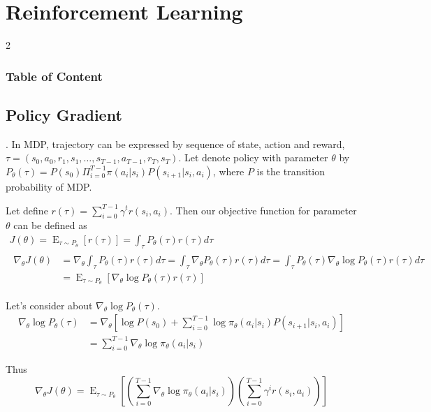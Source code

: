 \documentclass[8pt]{beamer}
\begin{document}
\section{Reinforcement Learning}
\begingroup
    \begin{frame}
        \begin{multicols}{2}
            \frametitle{Table of Content}
            \tableofcontents
        \end{multicols}
    \end{frame}
\endgroup
\subsection{Policy Gradient}
\begin{frame}{.}
    In MDP, trajectory can be expressed by sequence of state, action and reward, $\tau = (s_0, a_0, r_1, s_1, \dots, s_{T-1}, a_{T-1}, r_{T}, s_{T})$. 
    Let denote policy with parameter $\theta$ by $P_\theta(\tau) = P(s_0) \Pi_{i=0}^{T-1} \pi(a_i|s_i) P(s_{i+1}| s_i, a_i) $, where $P$ is the transition probability of MDP.

    Let define $r(\tau) = \sum_{i=0}^{T-1} \gamma^t r(s_i, a_i)$. Then our objective function for parameter $\theta$ can be defined as 
    \[
    \begin{gathered}
        J(\theta) = \operatorname{E}_{\tau \sim P_\theta}[r(\tau)] = \int_{\tau} P_\theta(\tau) r(\tau) d\tau \\
        \begin{aligned}
            \nabla_{\theta} J(\theta) &= \nabla_\theta \int_\tau P_\theta (\tau) r(\tau) d\tau = \int_\tau \nabla_\theta P_\theta (\tau) r(\tau) d\tau = \int_\tau P_\theta (\tau) \nabla_\theta \log{P_\theta(\tau)} r(\tau) d\tau\\ 
            &= \operatorname{E}_{\tau \sim P_\theta}[\nabla_\theta \log{P_\theta (\tau)} r(\tau)] 
        \end{aligned}
    \end{gathered}
    \]

    Let's consider about $\nabla_\theta \log{P_\theta (\tau)}$.
    \[
        \begin{aligned}
            \nabla_\theta \log{P_\theta (\tau)} &= \nabla_\theta [\log{P(s_0)} + \sum_{i=0}^{T-1} \log{\pi_\theta (a_i| s_i) P(s_{i+1}| s_i, a_i) } ]\\
            &= \sum_{i=0}^{T-1} \nabla_\theta \log{\pi_\theta (a_i |s_i)}
        \end{aligned}
    \]
    
    Thus
    \[
        \nabla_\theta J(\theta) = \operatorname{E}_{\tau \sim P_\theta}\left[\left(\sum_{i=0}^{T-1}\nabla_\theta \log{\pi_\theta}(a_i|s_i)\right) \left(\sum_{i=0}^{T-1} \gamma^i r(s_i, a_i) \right)\right]
    \]
\end{frame}
\end{document}

